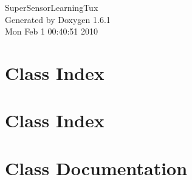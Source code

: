 \documentclass[a4paper]{book}
\begin{document}
\hypersetup{pageanchor=false}
\begin{titlepage}
\vspace*{7cm}
\begin{center}
{\Large SuperSensorLearningTux }\\
\vspace*{1cm}
{\large Generated by Doxygen 1.6.1}\\
\vspace*{0.5cm}
{\small Mon Feb 1 00:40:51 2010}\\
\end{center}
\end{titlepage}
\clearemptydoublepage
{}
\tableofcontents
\clearemptydoublepage
{}
\hypersetup{pageanchor=true}
\chapter{Class Index}

\chapter{Class Index}

\chapter{Class Documentation}




































\printindex
\end{document}
